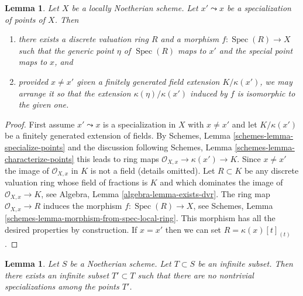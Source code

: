 \documentclass{stacks-project}
\theoremstyle{plain}
\newtheorem{lemma}[subsection]{Lemma}
\theoremstyle{definition}
\theoremstyle{remark}
\numberwithin{equation}{subsection}
\def\Spec{\mathop{\mathrm{Spec}}}
\begin{document}
\begin{lemma}
\label{lemma-locally-Noetherian-specialization-dvr}
Let $X$ be a locally Noetherian scheme.
Let $x' \leadsto x$ be a specialization of points of $X$. Then
\begin{enumerate}
\item there exists a discrete valuation ring $R$ and a morphism
$f : \Spec(R) \to X$ such that the generic point $\eta$ of
$\Spec(R)$ maps to $x'$ and the special point maps to $x$, and
\item provided $x \not = x'$ given a finitely generated field
extension $K/\kappa(x')$, we may arrange it so that the extension
$\kappa(\eta)/\kappa(x')$
induced by $f$ is isomorphic to the given one.
\end{enumerate}
\end{lemma}

\begin{proof}
First assume $x' \leadsto x$ is a specialization in $X$
with $x \not = x'$ and let $K/\kappa(x')$ be a finitely
generated extension of fields. By
Schemes, Lemma \ref{schemes-lemma-specialize-points}
and the discussion following
Schemes, Lemma \ref{schemes-lemma-characterize-points}
this leads to ring maps $\mathcal{O}_{X, x} \to \kappa(x') \to K$.
Since $x \not = x'$ the image of $\mathcal{O}_{X, x}$ in $K$
is not a field (details omitted).
Let $R \subset K$ be any discrete valuation ring whose field of fractions is
$K$ and which dominates the image of $\mathcal{O}_{X, x} \to K$, see
Algebra, Lemma \ref{algebra-lemma-exists-dvr}.
The ring map $\mathcal{O}_{X, x} \to R$ induces the morphism
$f : \Spec(R) \to X$, see
Schemes, Lemma \ref{schemes-lemma-morphism-from-spec-local-ring}.
This morphism has all the desired properties by construction.
If $x = x'$ then we can set $R = \kappa(x)[t]_{(t)}$.
\end{proof}

\begin{lemma}
\label{lemma-thin-infinite-sequence}
Let $S$ be a Noetherian scheme. Let $T \subset S$ be an infinite subset.
Then there exists an infinite subset $T' \subset T$
such that there are no nontrivial specializations among the points $T'$.
\end{lemma}
\end{document}
